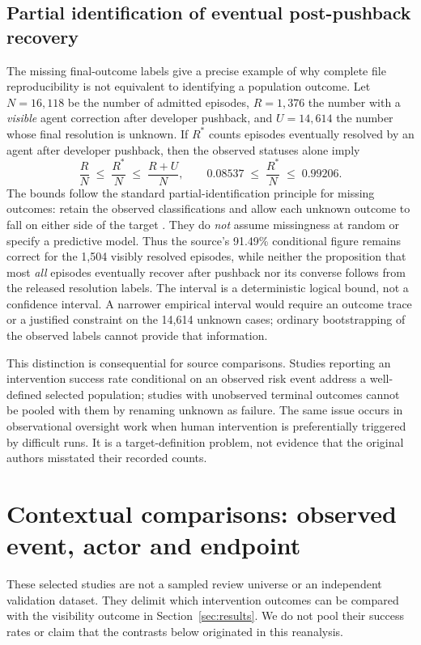 \subsection{Partial identification of eventual post-pushback recovery}\label{sec:bounds}
The missing final-outcome labels give a precise example of why complete file reproducibility is not equivalent to identifying a population outcome. Let $N=16{,}118$ be the number of admitted episodes, $R=1{,}376$ the number with a \emph{visible} agent correction after developer pushback, and $U=14{,}614$ the number whose final resolution is unknown. If $R^{*}$ counts episodes eventually resolved by an agent after developer pushback, then the observed statuses alone imply
\begin{equation}\label{eq:bounds}
 \frac{R}{N}\;\leq\;\frac{R^{*}}{N}\;\leq\;\frac{R+U}{N},\qquad
 0.08537\;\leq\;\frac{R^{*}}{N}\;\leq\;0.99206.
\end{equation}
The bounds follow the standard partial-identification principle for missing outcomes: retain the observed classifications and allow each unknown outcome to fall on either side of the target \cite{ref47}. They do \emph{not} assume missingness at random or specify a predictive model. Thus the source's 91.49\% conditional figure remains correct for the 1,504 visibly resolved episodes, while neither the proposition that most \emph{all} episodes eventually recover after pushback nor its converse follows from the released resolution labels. The interval is a deterministic logical bound, not a confidence interval. A narrower empirical interval would require an outcome trace or a justified constraint on the 14,614 unknown cases; ordinary bootstrapping of the observed labels cannot provide that information.

This distinction is consequential for source comparisons. Studies reporting an intervention success rate conditional on an observed risk event address a well-defined selected population; studies with unobserved terminal outcomes cannot be pooled with them by renaming unknown as failure. The same issue occurs in observational oversight work when human intervention is preferentially triggered by difficult runs. It is a target-definition problem, not evidence that the original authors misstated their recorded counts.


\section{Contextual comparisons: observed event, actor and endpoint}\label{sec:context}
These selected studies are not a sampled review universe or an independent validation dataset. They delimit which intervention outcomes can be compared with the visibility outcome in Section~\ref{sec:results}. We do not pool their success rates or claim that the contrasts below originated in this reanalysis.


